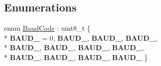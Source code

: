 \subsection*{Enumerations}
\begin{DoxyCompactItemize}
\item 
\hypertarget{namespaceroomba_1_1series500_1_1oi_ae5028fe52e1dabe309aff04a45581bfd}{enum \hyperlink{namespaceroomba_1_1series500_1_1oi_ae5028fe52e1dabe309aff04a45581bfd}{Baud\+Code} \+: uint8\+\_\+t \{ \\*
{\bfseries B\+A\+U\+D\+\_} = 0, 
{\bfseries B\+A\+U\+D\+\_}, 
{\bfseries B\+A\+U\+D\+\_}, 
{\bfseries B\+A\+U\+D\+\_}, 
\\*
{\bfseries B\+A\+U\+D\+\_}, 
{\bfseries B\+A\+U\+D\+\_}, 
{\bfseries B\+A\+U\+D\+\_}, 
{\bfseries B\+A\+U\+D\+\_}, 
\\*
{\bfseries B\+A\+U\+D\+\_}, 
{\bfseries B\+A\+U\+D\+\_}, 
{\bfseries B\+A\+U\+D\+\_}, 
{\bfseries B\+A\+U\+D\+\_}
 \}}\label{namespaceroomba_1_1series500_1_1oi_ae5028fe52e1dabe309aff04a45581bfd}


\end{DoxyCompactItemize}
